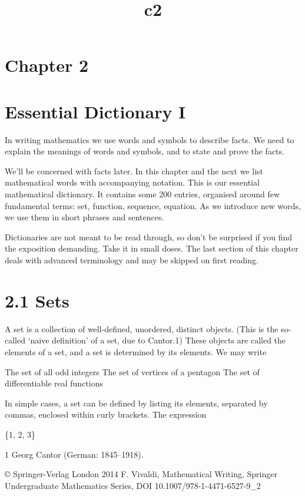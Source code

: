 \documentclass[11pt]{article}
\title{c2}
\date{}
\theoremstyle{plain}
\theoremstyle{definition}
\begin{document}
\maketitle

\section{Chapter 2}

\section{Essential Dictionary I}

In writing mathematics we use words and symbols to describe facts. We need to explain the meanings of words and symbols, and to state and prove the facts.

We'll be concerned with facts later. In this chapter and the next we list mathematical words with accompanying notation. This is our essential mathematical dictionary. It contains some 200 entries, organised around few fundamental terms: set, function, sequence, equation. As we introduce new words, we use them in short phrases and sentences.

Dictionaries are not meant to be read through, so don't be surprised if you find the exposition demanding. Take it in small doses. The last section of this chapter deals with advanced terminology and may be skipped on first reading.

\section{2.1 Sets}

A set is a collection of well-defined, unordered, distinct objects. (This is the so-called `naive definition' of a set, due to Cantor.1) These objects are called the elements of a set, and a set is determined by its elements. We may write

The set of all odd integers The set of vertices of a pentagon The set of differentiable real functions

In simple cases, a set can be defined by listing its elements, separated by commas, enclosed within curly brackets. The expression

\{1, 2, 3\}

1 Georg Cantor (German: 1845--1918).

© Springer-Verlag London 2014 F. Vivaldi, Mathematical Writing, Springer Undergraduate Mathematics Series, DOI 10.1007/978-1-4471-6527-9\_2
\end{document}
